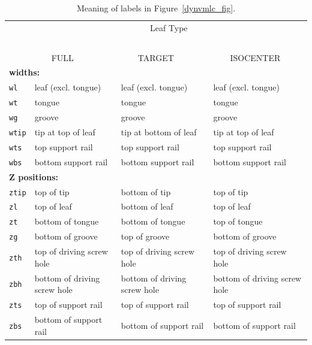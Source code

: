 \documentclass[12pt,twoside]{article}
\begin{document}
\begin{table}[htb]
\caption{Meaning of labels in Figure~\ref{dynvmlc_fig}.}
\hspace*{-0.5cm}\begin{tabular}{llll}
\\
& \multicolumn{3}{c}{Leaf Type}\\
& \multicolumn{3}{c}{~~~}\\
& ~~~~FULL & ~~~~TARGET & ~~~~ISOCENTER \\
\hline
\multicolumn{4}{l}{{\bf widths:}} \\
{\tt wl} & leaf (excl. tongue) & leaf (excl. tongue) & leaf (excl. tongue)\\
{\tt wt} & tongue & tongue & tongue\\
{\tt wg} & groove & groove & groove\\
{\tt wtip} & tip at top of leaf & tip at bottom of leaf & tip at top of leaf\\
{\tt wts} & top support rail & top support rail & top support rail\\
{\tt wbs} & bottom support rail & bottom support rail & bottom support rail\\
\hline
\multicolumn{4}{l}{{\bf Z positions:}} \\
{\tt ztip} & top of tip & bottom of tip & top of tip\\
{\tt zl} & top of leaf & bottom of leaf & top of leaf\\
{\tt zt} & bottom of tongue & bottom of tongue & top of tongue\\
{\tt zg} & bottom of groove & top of groove & bottom of groove\\
{\tt zth} & top of driving screw hole & top of driving screw hole & top of driving screw hole\\
{\tt zbh} & bottom of driving screw hole & bottom of driving screw hole & bottom of driving screw hole\\
{\tt zts} & top of support rail & top of support rail & top of support rail\\
{\tt zbs} & bottom of support rail & bottom of support rail & bottom of support rail\\
\end{tabular}
\label{dynvmlc_tab}
\end{table}
\end{document}
